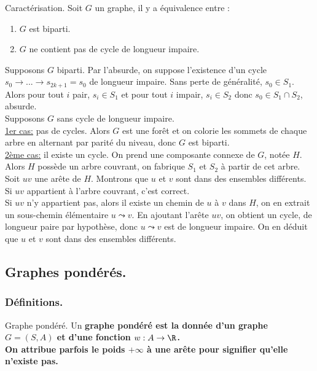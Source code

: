 \documentclass[french, 11pt]{article}
\begin{document}
\begin{thm}{Caractérisation.}{}{}
    Soit $G$ un graphe, il y a équivalence entre :
    \begin{enumerate}
        \item $G$ est biparti.
        \item $G$ ne contient pas de cycle de longueur impaire.
    \end{enumerate}
    \tcblower
    \fbox{$\ra$} Supposons $G$ biparti. Par l'absurde, on suppose l'existence d'un cycle $s_0\to...\to s_{2k+1}=s_0$ de longueur impaire.
    Sans perte de généralité, $s_0\in S_1$.\\
    Alors pour tout $i$ pair, $s_i\in S_1$ et pour tout $i$ impair, $s_i\in S_2$ donc $s_0\in S_1\cap S_2$, absurde.\\
    \fbox{$\la$} Supposons $G$ sans cycle de longueur impaire.\\
    \underline{1er cas:} pas de cycles. Alors $G$ est une forêt et on colorie les sommets de chaque arbre en alternant par parité du niveau, donc $G$ est biparti.\\
    \underline{2ème cas:} il existe un cycle. On prend une composante connexe de $G$, notée $H$. Alors $H$ possède un arbre couvrant, on fabrique $S_1$ et $S_2$ à partir de cet arbre.\\
    Soit $uv$ une arête de $H$. Montrons que $u$ et $v$ sont dans des ensembles différents.\\
    Si $uv$ appartient à l'arbre couvrant, c'est correct.\\
    Si $uv$ n'y appartient pas, alors il existe un chemin de $u$ à $v$ dans $H$, on en extrait un sous-chemin élémentaire $u \leadsto v$. En ajoutant l'arête $uv$, on obtient un cycle, de longueur paire par hypothèse, donc $u\leadsto v$ est de longueur impaire. On en déduit que $u$ et $v$ sont dans des ensembles différents.
\end{thm}

\vspace*{-1cm}

\subsection{Graphes pondérés.}

\subsubsection{Définitions.}

\begin{defi}{Graphe pondéré.}{}
    Un \bf{graphe pondéré} est la donnée d'un graphe $G=(S,A)$ et d'une fonction $w:A\to\R$.\\
    On attribue parfois le poids $+\infty$ à une arête pour signifier qu'elle n'existe pas.
\end{defi}
\end{document}
